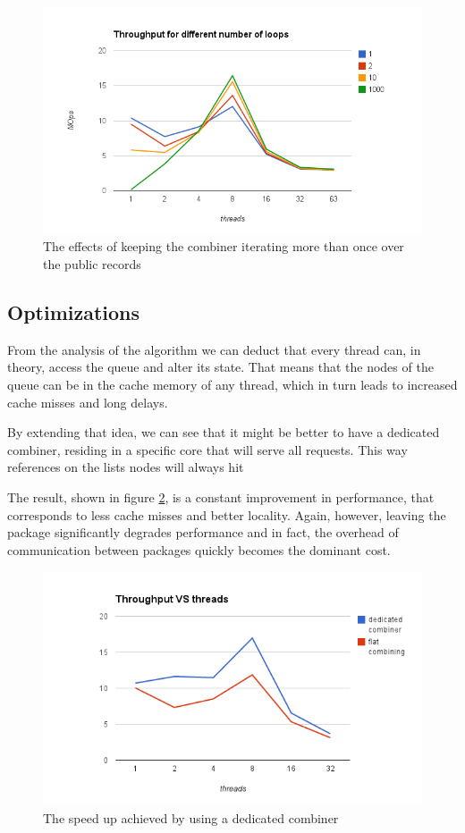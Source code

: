 \begin{figure}
 \centering
  \includegraphics[scale=0.7]{queue_fc_queue_loops.png}
\caption{The effects of keeping the combiner iterating more than once over the public records}
\label{queue_fc_queue_loops}
\end{figure}

\subsection{Optimizations}


From the analysis of the algorithm we can deduct that every thread can, in theory, access the queue and alter its state. That means that the nodes of the queue can be in the cache memory of any thread, which in turn leads to increased cache misses and long delays.

By extending that idea, we can see that it might be better to have a dedicated combiner, residing in a specific core that will serve all requests. This way references on the lists nodes will always hit


The result, shown in figure \ref{queue_fc_dedicated_perf}, is a constant improvement in performance, that corresponds  to less cache misses and better locality. Again, however, leaving the package significantly degrades performance and in fact, the overhead of communication between packages quickly becomes the dominant cost.

\begin{figure}
 \centering
  \includegraphics[scale=0.7]{queue_fc_dedicated_perf.png}
\caption{The speed up achieved by using a dedicated combiner}
\label{queue_fc_dedicated_perf}
\end{figure}

